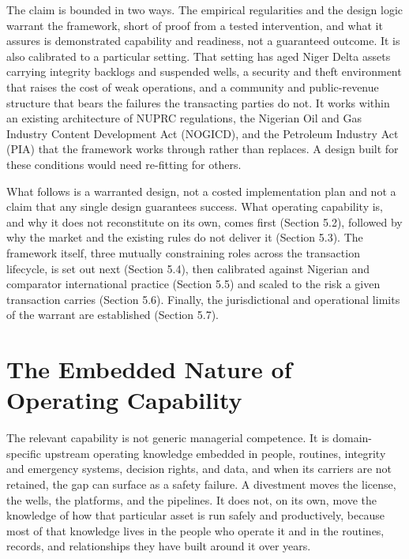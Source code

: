 The claim is bounded in two ways. The empirical regularities and the
design logic warrant the framework, short of proof from a tested
intervention, and what it assures is demonstrated capability and
readiness, not a guaranteed outcome. It is also calibrated to a
particular setting. That setting has aged Niger Delta assets carrying
integrity backlogs and suspended wells, a security and theft environment
that raises the cost of weak operations, and a community and
public-revenue structure that bears the failures the transacting parties
do not. It works within an existing architecture of NUPRC regulations,
the Nigerian Oil and Gas Industry Content Development Act (NOGICD), and
the Petroleum Industry Act (PIA) that the framework works through rather
than replaces. A design built for these conditions would need re-fitting
for others.

What follows is a warranted design, not a costed implementation plan and
not a claim that any single design guarantees success. What operating
capability is, and why it does not reconstitute on its own, comes first
(Section 5.2), followed by why the market and the existing rules do not
deliver it (Section 5.3). The framework itself, three mutually
constraining roles across the transaction lifecycle, is set out next
(Section 5.4), then calibrated against Nigerian and comparator
international practice (Section 5.5) and scaled to the risk a given
transaction carries (Section 5.6). Finally, the jurisdictional and
operational limits of the warrant are established (Section 5.7).

\hypertarget{the-embedded-nature-of-operating-capability}{%
\section{The Embedded Nature of Operating
Capability}\label{the-embedded-nature-of-operating-capability}}

The relevant capability is not generic managerial competence. It is
domain-specific upstream operating knowledge embedded in people,
routines, integrity and emergency systems, decision rights, and data,
and when its carriers are not retained, the gap can surface as a safety
failure. A divestment moves the license, the wells, the platforms, and
the pipelines. It does not, on its own, move the knowledge of how that
particular asset is run safely and productively, because most of that
knowledge lives in the people who operate it and in the routines,
records, and relationships they have built around it over years.

